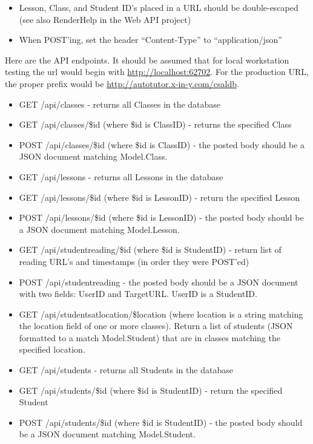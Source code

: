 \documentclass[letterpaper,10pt]{article}
\begin{document}
\begin{itemize}
    \item Lesson, Class, and Student ID's placed in a URL should be double-escaped
          (see also RenderHelp in the Web API project)
    \item When POST'ing, set the header ``Content-Type'' to ``application/json''
\end{itemize}

Here are the API endpoints. It should be assumed that for local
workstation testing the url would begin with \url{http://localhost:62702}.  For
the production URL, the proper prefix would be \url{http://autotutor.x-in-y.com/csaldb}.

\begin{itemize}
    \item GET /api/classes - returns all Classes in the database
    \item GET /api/classes/\$id (where \$id is ClassID) - returns the specified Class
    \item POST /api/classes/\$id (where \$id is ClassID) - the posted body should be
          a JSON document matching Model.Class.
          
    \item GET /api/lessons - returns all Lessons in the database
    \item GET /api/lessons/\$id (where \$id is LessonID) - return the specified Lesson
    \item POST /api/lessons/\$id (where \$id is LessonID) - the posted body should be
          a JSON document matching Model.Lesson.

    \item GET /api/studentreading/\$id (where \$id is StudentID) - return list of
          reading URL's and timestamps (in order they were POST'ed)
    \item POST /api/studentreading - the posted body should be a JSON document with
          two fields: UserID and TargetURL.  UserID is a StudentID.

    \item GET /api/studentsatlocation/\$location (where location is a string matching
          the location field of one or more classes).  Return a list of students (JSON
          formatted to a match Model.Student) that are in classes matching the specified
          location.

    \item GET /api/students - returns all Students in the database
    \item GET /api/students/\$id (where \$id is StudentID) - return the specified Student
    \item POST /api/students/\$id (where \$id is StudentID) - the posted body should be
          a JSON document matching Model.Student.
    

\end{itemize}
\end{document}
